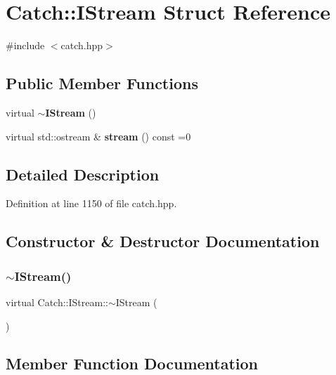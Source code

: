 \section{Catch\+::I\+Stream Struct Reference}
\label{struct_catch_1_1_i_stream}


{\ttfamily \#include $<$catch.\+hpp$>$}

\subsection*{Public Member Functions}
\begin{DoxyCompactItemize}
\item 
virtual \textbf{ $\sim$\+I\+Stream} ()
\item 
virtual std\+::ostream \& \textbf{ stream} () const =0
\end{DoxyCompactItemize}


\subsection{Detailed Description}


Definition at line 1150 of file catch.\+hpp.



\subsection{Constructor \& Destructor Documentation}
\mbox{\label{struct_catch_1_1_i_stream_a344a88d0e5fc1f727f5801c72b4a4e2a}} 
\subsubsection{$\sim$IStream()}
{\footnotesize\ttfamily virtual Catch\+::\+I\+Stream\+::$\sim$\+I\+Stream (\begin{DoxyParamCaption}{ }\end{DoxyParamCaption})\hspace{0.3cm}{\ttfamily [virtual]}}



\subsection{Member Function Documentation}
\mbox{\label{struct_catch_1_1_i_stream_a55a9ddbe250261ff38642f480ebdd902}} 
